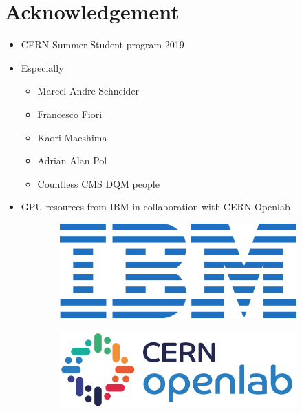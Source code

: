 \chapter*{Acknowledgement}


\begin{itemize}
    \item CERN Summer Student program 2019
    \item Especially
    \begin{itemize}
        \item Marcel Andre Schneider
        \item Francesco Fiori
        \item Kaori Maeshima
        \item Adrian Alan Pol
        \item Countless CMS DQM people
    \end{itemize}
    \item GPU resources from IBM in collaboration with CERN Openlab
\end{itemize}



\begin{figure}[h!]
    \begin{subfigure}[b]{1.2in}
        \includegraphics[width=\linewidth]{images/ibm.png}
    \end{subfigure}
    \begin{subfigure}[b]{1.8in}
        \includegraphics[width=\linewidth]{images/cern_openlab.png}
    \end{subfigure}
\end{figure}